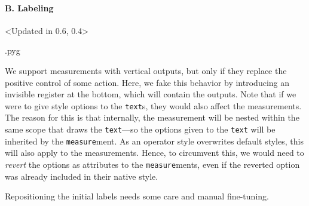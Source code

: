 \documentclass{scrartcl}
\makeatletter
\newenvironment{codeexample}{%
   \VerbatimEnvironment%
   \let\FVB@VerbatimOut\minted@FVB@VerbatimOut
   \let\FVE@VerbatimOut\minted@FVE@VerbatimOut
   \minted@configlang{tex}%
   \minted@fvset
   \begin{VerbatimOut}[codes={\catcode`\^^I=12},firstline,lastline]{\minted@jobname.pyg}%
}{
   \end{VerbatimOut}%
   \minted@langlinenoson%
   \savebox\codeexamplebox{ \minted@jobname.pyg}%
   \ifdim\wd\codeexamplebox>\dimexpr.5\linewidth-3mm\relax%
      \wd\codeexamplebox=.5\linewidth%
   \else%
      \wd\codeexamplebox=\dimexpr\wd\codeexamplebox+3mm\relax%
   \fi%
   \noindent\begin{minipage}{\wd\codeexamplebox}%
      \centering%
      \usebox\codeexamplebox%
   \end{minipage}%
   \begin{minipage}{\dimexpr\linewidth-\wd\codeexamplebox\relax}%
      \expandafter\minted@pygmentize\expandafter{\minted@lang}%
   \end{minipage}%
   \minted@langlinenosoff%
   \par%
}
\def\ttlink{\link\texttt}
\makeatother
\begin{document}
            \paragraph{B. Labeling}\leavevmode
               \begin{example}<Updated in 0.6, 0.4>
                  \begin{codeexample}
                  \end{codeexample}
                  We support measurements with vertical outputs, but only if they replace the positive control of some action.
                  Here, we fake this behavior by introducing an invisible register at the bottom, which will contain the outputs.
                  Note that if we were to give style options to the \ttlink{text}s, they would also affect the measurements.
                  The reason for this is that internally, the measurement will be nested within the same scope that draws the \ttlink{text}---so the options given to the \ttlink{text} will be inherited by the \ttlink{measure}ment.
                  As an operator style overwrites default styles, this will also apply to the measurements.
                  Hence, to circumvent this, we would need to \emph{revert} the options as attributes to the \ttlink{measure}ments, even if the reverted option was already included in their native style.

                  Repositioning the initial labels needs some care and manual fine\hyp tuning.
               \end{example}
\end{document}
